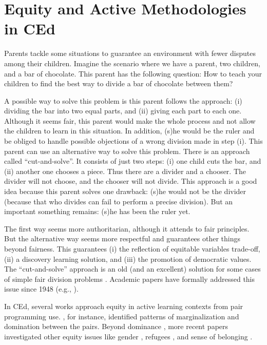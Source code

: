 \section{Equity and Active Methodologies in CEd}
\label{equity-sec:active-learning}

Parents tackle some situations to guarantee an environment with fewer disputes among their children. Imagine the scenario where we have a parent, two children, and a bar of chocolate. This parent has the following question: How to teach your children to find the best way to divide a bar of chocolate between them?

A possible way to solve this problem is this parent follows the approach: (i) dividing the bar into two equal parts, and (ii) giving each part to each one.  Although it seems fair, this parent would make the whole process and not allow the children to learn in this situation. In addition, (s)he would be the ruler and be obliged to handle possible objections of a wrong division made in step (i).
This parent can use an alternative way to solve this problem. There is an approach called “cut-and-solve”. It consists of just two steps: (i) one child cuts the bar, and (ii) another one chooses a piece. Thus there are a divider and a chooser. The divider will not choose, and the chooser will not divide. This approach is a good idea because this parent solves one drawback: (s)he would not be the divider (because that who divides can fail to perform a precise division). But an important something remains: (s)he has been the ruler yet.

The first way seems more authoritarian, although it attends to fair principles. But the alternative way seems more respectful and guarantees other things beyond fairness. This guarantees (i) the reflection of equitable variables trade-off, (ii) a discovery learning solution, and (iii) the promotion of democratic values. The “cut-and-solve” approach is an old (and an excellent) solution for some cases of simple fair division problems \cite{brams:2020}. Academic papers have formally addressed this issue since 1948 (e.g., ).

In \gls{CEd}, several works approach equity in active learning contexts from pair programming use. , for instance, identified patterns of marginalization and domination between the pairs. Beyond dominance \cite{grabl:2024}, more recent papers investigated other equity issues like gender \cite{bodaker:2023}, refugees \cite{arawjo:2021}, and sense of belonging \cite{izhikevich:2022}.

